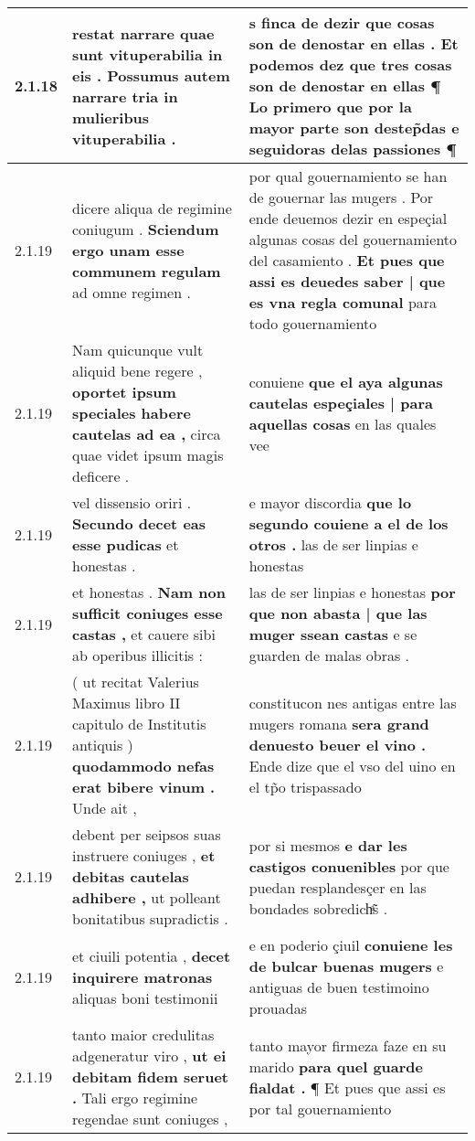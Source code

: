\begin{tabular}{|p{1cm}|p{6.5cm}|p{6.5cm}|}
2.1.18 & restat narrare quae sunt vituperabilia in eis . \textbf{ Possumus autem narrare tria } in mulieribus vituperabilia . & s finca de dezir que cosas son de denostar en ellas . \textbf{ Et podemos dez que tres cosas son de denostar en ellas ¶ } Lo primero que por la mayor parte son destep̃das e seguidoras delas passiones ¶ \\\hline
2.1.19 & dicere aliqua de regimine coniugum . \textbf{ Sciendum ergo unam esse communem regulam } ad omne regimen . & por qual gouernamiento se han de gouernar las mugers . Por ende deuemos dezir en espeçial algunas cosas del gouernamiento del casamiento . \textbf{ Et pues que assi es deuedes saber | que es vna regla comunal } para todo gouernamiento \\\hline
2.1.19 & Nam quicunque vult aliquid bene regere , \textbf{ oportet ipsum speciales habere cautelas ad ea , } circa quae videt ipsum magis deficere . & conuiene \textbf{ que el aya algunas cautelas espeçiales | para aquellas cosas } en las quales vee \\\hline
2.1.19 & vel dissensio oriri . \textbf{ Secundo decet eas esse pudicas } et honestas . & e mayor discordia \textbf{ que lo segundo couiene a el de los otros . } las de ser linpias e honestas \\\hline
2.1.19 & et honestas . \textbf{ Nam non sufficit coniuges esse castas , } et cauere sibi ab operibus illicitis : & las de ser linpias e honestas \textbf{ por que non abasta | que las muger ssean castas } e se guarden de malas obras . \\\hline
2.1.19 & ( ut recitat Valerius Maximus libro II capitulo de Institutis antiquis ) \textbf{ quodammodo nefas erat bibere vinum . } Unde ait , & constitucon nes antigas entre las mugers romana \textbf{ sera grand denuesto beuer el vino . } Ende dize que el vso del uino en el tp̃o trispassado \\\hline
2.1.19 & debent per seipsos suas instruere coniuges , \textbf{ et debitas cautelas adhibere , } ut polleant bonitatibus supradictis . & por si mesmos \textbf{ e dar les castigos conuenibles } por que puedan resplandesçer en las bondades sobredichͣ̃s . \\\hline
2.1.19 & et ciuili potentia , \textbf{ decet inquirere matronas } aliquas boni testimonii & e en poderio çiuil \textbf{ conuiene les de bulcar buenas mugers } e antiguas de buen testimoino prouadas \\\hline
2.1.19 & tanto maior credulitas adgeneratur viro , \textbf{ ut ei debitam fidem seruet . } Tali ergo regimine regendae sunt coniuges , & tanto mayor firmeza faze en su marido \textbf{ para quel guarde fialdat . } ¶ Et pues que assi es por tal gouernamiento \\\hline

\end{tabular}
